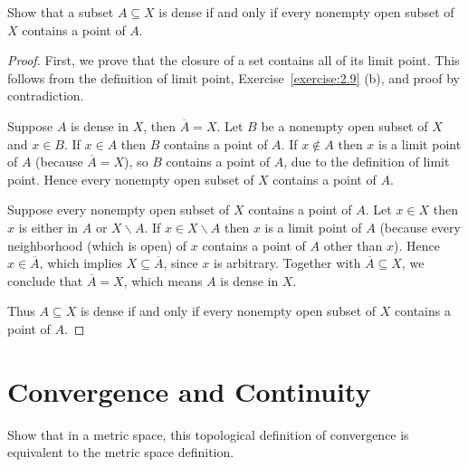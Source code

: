 \begin{exercise}{2.11}
	Show that a subset $A \subseteq X$ is dense if and only if every nonempty open subset of $X$ contains a point of $A$.
\end{exercise}

\begin{proof}
	First, we prove that the closure of a set contains all of its limit point. This follows from the definition of limit point, Exercise~\ref{exercise:2.9} (b), and proof by contradiction.

	Suppose $A$ is dense in $X$, then $\overline{A} = X$. Let $B$ be a nonempty open subset of $X$ and $x\in B$. If $x\in A$ then $B$ contains a point of $A$. If $x\notin A$ then $x$ is a limit point of $A$ (because $\overline{A} = X$), so $B$ contains a point of $A$, due to the definition of limit point. Hence every nonempty open subset of $X$ contains a point of $A$.

	Suppose every nonempty open subset of $X$ contains a point of $A$. Let $x\in X$ then $x$ is either in $A$ or $X\smallsetminus A$. If $x\in X\smallsetminus A$ then $x$ is a limit point of $A$ (because every neighborhood (which is open) of $x$ contains a point of $A$ other than $x$). Hence $x\in \overline{A}$, which implies $X\subseteq \overline{A}$, since $x$ is arbitrary. Together with $\overline{A}\subseteq X$, we conclude that $\overline{A} = X$, which means $A$ is dense in $X$.

	Thus $A\subseteq X$ is dense if and only if every nonempty open subset of $X$ contains a point of $A$.
\end{proof}

\section*{Convergence and Continuity}

\begin{exercise}{2.12}
	Show that in a metric space, this topological definition of convergence is equivalent to the metric space definition.
\end{exercise}

